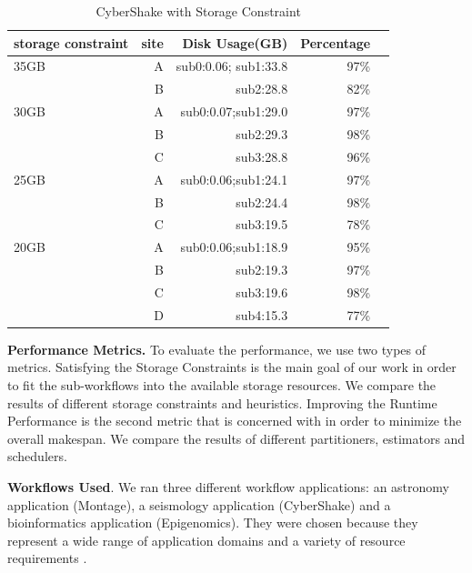 \begin{table}[h!]
\caption{CyberShake with Storage Constraint}
\label{tab:constraint}
\centering
\begin{tabular}{lrrrr}
\hline
 storage constraint    &    site &    Disk Usage(GB) &   Percentage  \\
\hline
35GB & A & sub0:0.06; sub1:33.8 & 97\%&\\
& B & sub2:28.8&82\% &\\
30GB & A & sub0:0.07;sub1:29.0 & 97\% \\
& B & sub2:29.3&98\% &\\
& C & sub3:28.8&96\% &\\
25GB & A & sub0:0.06;sub1:24.1 & 97\%& \\

 & B & sub2:24.4 & 98\%& \\
&C&sub3:19.5&78\%&\\
20GB&A&sub0:0.06;sub1:18.9&95\%&\\
&B&sub2:19.3&97\%&\\
&C&sub3:19.6&98\%&\\
&D&sub4:15.3&77\%&\\
\hline
\end{tabular}
\end{table} 


\textbf{Performance Metrics.} To evaluate the performance, we use two types of metrics. Satisfying the Storage Constraints is the main goal of our work in order to fit the sub-workflows into the available storage resources. We compare the results of different storage constraints and heuristics. Improving the Runtime Performance is the second metric that is concerned with in order to minimize the overall makespan. We compare the results of different partitioners, estimators and schedulers. 

\textbf{Workflows Used}. We ran three different workflow applications: an astronomy application (Montage), a seismology application (CyberShake) and a bioinformatics application (Epigenomics). They were chosen because they represent a wide range of application domains and a variety of resource requirements \cite{Juve2009}. 



